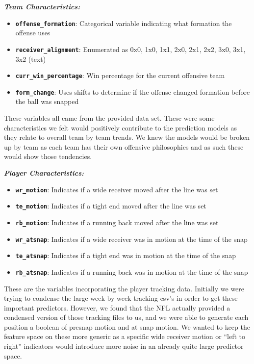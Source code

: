 \documentclass[
]{article}
\providecommand{\tightlist}{%
  \setlength{\itemsep}{0pt}\setlength{\parskip}{0pt}}
\begin{document}
\textbf{\emph{Team Characteristics:}}

\begin{itemize}
\tightlist
\item
  \textbf{\texttt{offense\_formation}}: Categorical variable indicating
  what formation the offense uses
\item
  \textbf{\texttt{receiver\_alignment}}: Enumerated as 0x0, 1x0, 1x1,
  2x0, 2x1, 2x2, 3x0, 3x1, 3x2 (text)
\item
  \textbf{\texttt{curr\_win\_percentage}}: Win percentage for the
  current offensive team
\item
  \textbf{\texttt{form\_change}}: Uses shifts to determine if the
  offense changed formation before the ball was snapped
\end{itemize}

These variables all came from the provided data set. These were some
characteristics we felt would positively contribute to the prediction
models as they relate to overall team by team trends. We knew the models
would be broken up by team as each team has their own offensive
philosophies and as such these would show those tendencies.

\textbf{\emph{Player Characteristics:}}

\begin{itemize}
\tightlist
\item
  \textbf{\texttt{wr\_motion}}: Indicates if a wide receiver moved after
  the line was set
\item
  \textbf{\texttt{te\_motion}}: Indicates if a tight end moved after the
  line was set
\item
  \textbf{\texttt{rb\_motion}}: Indicates if a running back moved after
  the line was set
\item
  \textbf{\texttt{wr\_atsnap}}: Indicates if a wide receiver was in
  motion at the time of the snap
\item
  \textbf{\texttt{te\_atsnap}}: Indicates if a tight end was in motion
  at the time of the snap
\item
  \textbf{\texttt{rb\_atsnap}}: Indicates if a running back was in
  motion at the time of the snap
\end{itemize}

These are the variables incorporating the player tracking data.
Initially we were trying to condense the large week by week tracking
csv's in order to get these important predictors. However, we found that
the NFL actually provided a condensed version of those tracking files to
us, and we were able to generate each position a boolean of presnap
motion and at snap motion. We wanted to keep the feature space on these
more generic as a specific wide receiver motion or ``left to right''
indicators would introduce more noise in an already quite large
predictor space.
\end{document}
